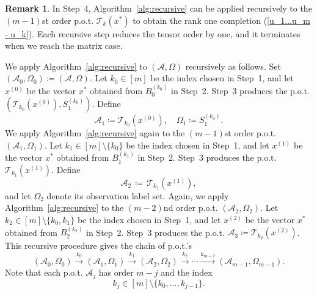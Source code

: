 \documentclass{amsart}
\newcommand{\reff}[1]{(\ref{#1})}
\newcommand{\mc}[1]{\mathcal{#1}}
\newcommand{\ddd}{,\ldots,}
\newcommand{\be}{\begin{equation}}
\newcommand{\ee}{\end{equation}}
\theoremstyle{definition}
\newtheorem{remark}[theorem]{Remark}
\numberwithin{equation}{section}
\begin{document}
\begin{remark}
In Step~4, Algorithm~\ref{alg:recursive} can be applied recursively to the $(m-1)$st order p.o.t. $\mc{T}_k(x^*)$ to obtain the rank one completion \reff{u_1...u_m - u_k}.
Each recursive step reduces the tensor order by one, 
and it terminates when we reach the matrix case.
\end{remark}



We apply Algorithm~\ref{alg:recursive} to $(\mc{A},\Omega)$ recursively as follows.
Set $(\mc{A}_0,\Omega_0)\coloneqq(\mc A,\Omega)$.
Let $k_0 \in [m]$ be the index chosen in Step~1, 
and let $x^{(0)}$ be the vector $x^*$ obtained from $B_0^{(k_0)}$ in Step~2.
Step~3 produces the p.o.t. $(\mc{T}_{k_0}(x^{(0)}), S_1^{(k_0)})$.
Define 
\[
\mc{A}_1 \coloneqq \mc{T}_{k_0}(x^{(0)}),
\quad \Omega_1 \coloneqq S_1^{(k_0)}.
\]
We apply Algorithm~\ref{alg:recursive} again to the $(m-1)$st order p.o.t. $(\mc{A}_1, \Omega_1)$.
Let $k_1 \in [m] \setminus \{k_0\}$ be the index chosen in Step~1,
and let $x^{(1)}$ be the vector $x^*$ obtained from $B_1^{(k_1)}$ in Step~2.
Step~3 produces the p.o.t. $\mc{T}_{k_1}(x^{(1)})$.
Define 
\[
\mc{A}_2 \,\coloneqq\, \mc{T}_{k_1}(x^{(1)}),
\]
and let $\Omega_2$ denote its observation label set.
Again, we apply Algorithm~\ref{alg:recursive} to the $(m-2)$nd order p.o.t. $(\mc{A}_2, \Omega_2)$.
Let $k_2 \in [m] \setminus \{k_0, k_1 \}$ be the index chosen in Step~1,
and let $x^{(2)}$ be the vector $x^*$ obtained from $B_2^{(k_2)}$ in Step~2.
Step~3 produces the p.o.t. $\mc{A}_3 \coloneqq \mc{T}_{k_2}(x^{(2)})$.
This recursive procedure gives the chain of p.o.t.'s
\be\label{chain}
(\mc{A}_0, \Omega_0) 
\overset{k_0}{\longrightarrow} (\mc{A}_1, \Omega_1) 
\overset{k_1}{\longrightarrow} (\mc{A}_2, \Omega_2)
\overset{k_2}{\longrightarrow}
\cdots 
\overset{k_{m-2}}{\longrightarrow} (\mc{A}_{m-1}, \Omega_{m-1}).
\ee
Note that each p.o.t. $\mc A_j$ has order $m-j$ and the index
\be\label{k_j}
k_j \in [m] \setminus \{ k_0 \ddd k_{j-1} \}.
\ee
\end{document}

